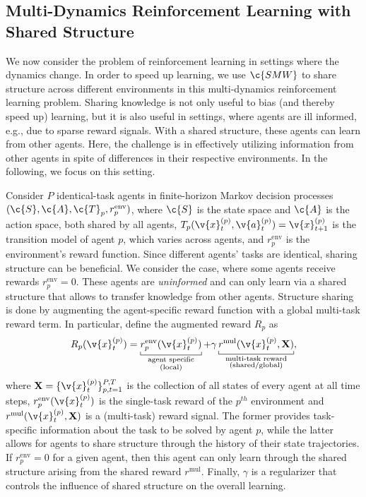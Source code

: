 \documentclass{article}
\begin{document}
\subsection{Multi-Dynamics Reinforcement Learning with Shared Structure}
\label{sec:multirl}

We now consider the problem of reinforcement learning in settings where the dynamics change. In order to speed up learning, we use  $\c{SMW}$ to share structure across different environments in this multi-dynamics reinforcement learning problem. 
Sharing knowledge is not only useful to bias (and thereby speed up) learning, but it is also useful in settings, where agents are ill informed, e.g., due to sparse reward signals. 
With a shared structure, these agents can learn from other agents. 
Here, the challenge is in effectively utilizing information from other agents in spite of differences in their respective environments. In the following, we focus on this setting.

Consider $P$ identical-task agents in finite-horizon Markov decision processes $(\c{S}, \c{A},\c{T}_p, r_p^{\text{env}})$, where $\c{S}$ is the state space and $\c{A}$ is the action space, both shared by all agents, $T_p(\v{x}^{(p)}_{t},\v{a}^{(p)}_t) = \v{x}^{(p)}_{t+1}$ is the  transition model of agent $p$, which varies across agents, and $r_p^{\text{env}}$ is the environment's reward function. 
Since different agents' tasks are identical, sharing structure can be beneficial. We consider the case, where some agents receive rewards $r_p^{\text{env}}=0$. These agents are \emph{uninformed} and can only learn  via a shared structure that allows to transfer knowledge from other agents.
Structure sharing is done by augmenting the agent-specific reward function  with a global multi-task reward term. In particular, define the augmented reward $R_p$ as
\[
\label{eq:rewards}
       R_p(\v{x}^{(p)}_t) = \underbracket[0.1ex]{r^{\text{env}}_p(\v{x}^{(p)}_t)}_{\substack{\text{agent specific}\\ \text{(local)}}} + \gamma \underbracket[0.1ex]{r^{\text{mul}}(\v{x}^{(p)}_t, \m{X})}_{\substack{\text{multi-task reward}\\\text{(shared/global)}}}, 
\]
where $\m{X} = \{\v{x}_t^{(p)}\}_{p,t=1}^{P,T}$ is the collection of all states of every agent at all time steps, $r^{\text{env}}_p(\v{x}^{(p)}_t)$ is the single-task reward of the $p^{th}$ environment and $r^{\text{mul}}(\v{x}^{(p)}_t, \m{X})$ is a (multi-task) reward signal.
The former provides task-specific information about the task to be solved by agent $p$, while the latter allows for agents to share structure through the history of their state trajectories. 
If $r^{\text{env}}_p = 0$ for a given agent, then this agent can only learn through the shared structure arising from the shared reward $r^{\text{mul}}$.  Finally, $\gamma$ is a regularizer that controls the influence of shared structure on the overall learning. 
\end{document}
